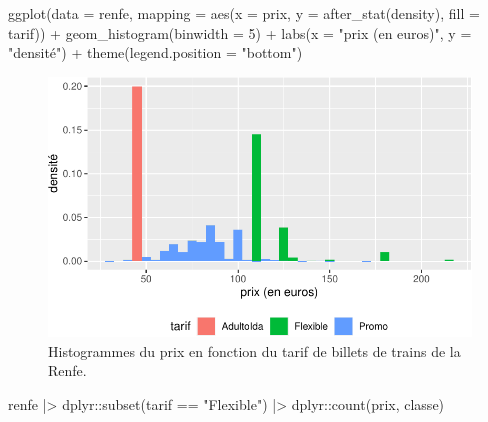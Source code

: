 \documentclass[
  11pt,
  letterpaper,
]{scrbook}
\newenvironment{Shaded}{\begin{snugshade}}{\end{snugshade}}
\newcommand{\AttributeTok}[1]{\textcolor[rgb]{0.40,0.45,0.13}{#1}}
\newcommand{\DecValTok}[1]{\textcolor[rgb]{0.68,0.00,0.00}{#1}}
\newcommand{\FunctionTok}[1]{\textcolor[rgb]{0.28,0.35,0.67}{#1}}
\newcommand{\NormalTok}[1]{\textcolor[rgb]{0.00,0.23,0.31}{#1}}
\newcommand{\SpecialCharTok}[1]{\textcolor[rgb]{0.37,0.37,0.37}{#1}}
\newcommand{\StringTok}[1]{\textcolor[rgb]{0.13,0.47,0.30}{#1}}
\theoremstyle{definition}
\theoremstyle{remark}
\begin{document}
\begin{Shaded}
\begin{Highlighting}[]
\FunctionTok{ggplot}\NormalTok{(}\AttributeTok{data =}\NormalTok{ renfe, }
       \AttributeTok{mapping =} \FunctionTok{aes}\NormalTok{(}\AttributeTok{x =}\NormalTok{ prix, }
                     \AttributeTok{y =} \FunctionTok{after\_stat}\NormalTok{(density), }
                     \AttributeTok{fill =}\NormalTok{ tarif)) }\SpecialCharTok{+}
    \FunctionTok{geom\_histogram}\NormalTok{(}\AttributeTok{binwidth =} \DecValTok{5}\NormalTok{) }\SpecialCharTok{+}
    \FunctionTok{labs}\NormalTok{(}\AttributeTok{x =} \StringTok{"prix (en euros)"}\NormalTok{, }
         \AttributeTok{y =} \StringTok{"densité"}\NormalTok{) }\SpecialCharTok{+} 
    \FunctionTok{theme}\NormalTok{(}\AttributeTok{legend.position =} \StringTok{"bottom"}\NormalTok{)}
\end{Highlighting}
\end{Shaded}

\begin{figure}[ht!]

{\centering \includegraphics[width=1\textwidth,height=\textheight]{./01-analyseexploratoire_files/figure-pdf/fig-renfe-aed7-1.pdf}

}

\caption{\label{fig-renfe-aed7}Histogrammes du prix en fonction du tarif
de billets de trains de la Renfe.}

\end{figure}

\begin{Shaded}
\begin{Highlighting}[]
\NormalTok{renfe }\SpecialCharTok{|\textgreater{}}
\NormalTok{  dplyr}\SpecialCharTok{::}\FunctionTok{subset}\NormalTok{(tarif  }\SpecialCharTok{==} \StringTok{"Flexible"}\NormalTok{) }\SpecialCharTok{|\textgreater{}}
\NormalTok{  dplyr}\SpecialCharTok{::}\FunctionTok{count}\NormalTok{(prix, classe)}
\end{Highlighting}
\end{Shaded}
\end{document}
